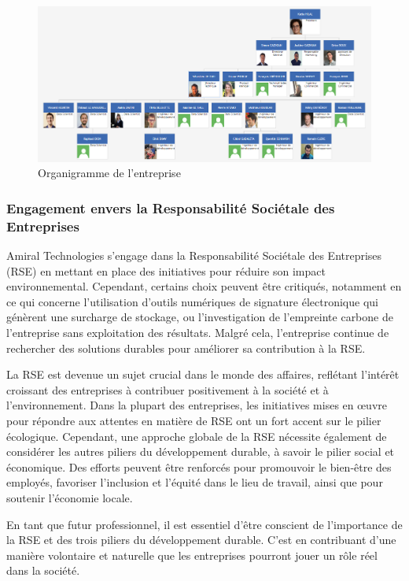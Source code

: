 \vspace{10px}
\begin{figure}[ht!]
    \centering
    \includegraphics[width=\textwidth]{paper/figures/orga.png}
    \caption{Organigramme de l'entreprise}
    \label{fig:organigramme}
\end{figure}


\subsubsection{Engagement envers la Responsabilité Sociétale des Entreprises}
Amiral Technologies s'engage dans la Responsabilité Sociétale des Entreprises (RSE) en mettant en place des initiatives pour réduire son impact environnemental.
Cependant, certains choix peuvent être critiqués, notamment en ce qui concerne l'utilisation d'outils numériques de signature électronique qui génèrent une surcharge de stockage, ou l'investigation de l'empreinte carbone de l'entreprise sans exploitation des résultats.
Malgré cela, l'entreprise continue de rechercher des solutions durables pour améliorer sa contribution à la RSE.

La RSE est devenue un sujet crucial dans le monde des affaires, reflétant l'intérêt croissant des entreprises à contribuer positivement à la société et à l'environnement.
Dans la plupart des entreprises, les initiatives mises en œuvre pour répondre aux attentes en matière de RSE ont un fort accent sur le pilier écologique.
Cependant, une approche globale de la RSE nécessite également de considérer les autres piliers du développement durable, à savoir le pilier social et économique.
Des efforts peuvent être renforcés pour promouvoir le bien-être des employés, favoriser l'inclusion et l'équité dans le lieu de travail, ainsi que pour soutenir l'économie locale.

En tant que futur professionnel, il est essentiel d'être conscient de l'importance de la RSE et des trois piliers du développement durable.
C'est en contribuant d'une manière volontaire et naturelle que les entreprises pourront jouer un rôle réel dans la société.

